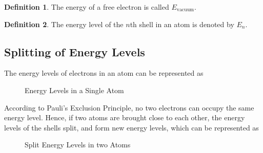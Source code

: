 \documentclass[titlepage, fleqn, a4paper, 12pt, twoside]{article}
\theoremstyle{definition}
\newtheorem{definition}{Definition}
\theoremstyle{theorem}
\begin{document}
\begin{definition}
	The energy of a free electron is called $E_{\text{vacuum}}$.
\end{definition}

\begin{definition}
	The energy level of the $n$th shell in an atom is denoted by $E_n$.
\end{definition}

\subsection{Splitting of Energy Levels}

The energy levels of electrons in an atom can be represented as
\begin{figure}[H]
	\centering
	\caption{Energy Levels in a Single Atom}
\end{figure}

According to Pauli's Exclusion Principle, no two electrons can occupy the same energy level.
Hence, if two atoms are brought close to each other, the energy levels of the shells split, and form new energy levels, which can be represented as
\begin{figure}[H]
	\centering
	\caption{Split Energy Levels in two Atoms}
\end{figure}
\end{document}
